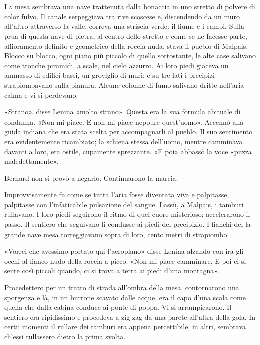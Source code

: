 \documentclass[
a5paper, %
10pt, %
twoside, 
onecolumn, %
openany, %
]{memoir}
\begin{document}
\chapter{\phantom{title}}

\lettrine{L}{a} mesa sembrava una nave trattenuta dalla bonaccia in uno stretto di polvere di color fulvo. Il canale serpeggiava tra rive scoscese e, discendendo da un muro all’altro attraverso la valle, correva una striscia verde: il fiume e i campi. Sulla prua di questa nave di pietra, al centro dello stretto e come se ne facesse parte, affioramento definito e geometrico della roccia nuda, stava il pueblo di Malpais. Blocco su blocco, ogni piano più piccolo di quello sottostante, le alte case salivano come tronche piramidi, a scale, nel cielo azzurro. Ai loro piedi giaceva un ammasso di edifici bassi, un groviglio di muri; e su tre lati i precipizi strapiombavano sulla pianura. Alcune colonne di fumo salivano dritte nell’aria calma e vi si perdevano.

«Strano», disse Lenina «molto strano». Questa era la sua formula abituale di condanna. «Non mi piace. E non mi piace neppure quest’uomo». Accennò alla guida indiana che era stata scelta per accompagnarli al pueblo. Il suo sentimento era evidentemente ricambiato; la schiena stessa dell’uomo, mentre camminava davanti a loro, era ostile, cupamente sprezzante. «E poi» abbassò la voce «puzza maledettamente».

Bernard non si provò a negarlo. Continuarono la marcia.

Improvvisamente fu come se tutta l’aria fosse diventata viva e palpitasse, palpitasse con l’infaticabile pulsazione del sangue. Lassù, a Malpais, i tamburi rullavano. I loro piedi seguirono il ritmo di quel cuore misterioso; accelerarono il passo. Il sentiero che seguivano li condusse ai piedi del precipizio. I fianchi del la grande nave mesa torreggiavano sopra di loro, cento metri di strapiombo.

«Vorrei che avessimo portato qui l’aeroplano» disse Lenina alzando con ira gli occhi al fianco nudo della roccia a picco. «Non mi piace camminare. E poi ci si sente così piccoli quando, ci si trova a terra ai piedi d’una montagna».

Procedettero per un tratto di strada all’ombra della mesa, contornarono una sporgenza e là, in un burrone scavato dalle acque, era il capo d’una scala come quella che dalla cabina conduce ai ponte di poppa. Vi si arrampicarono. Il sentiero era ripidissimo e procedeva a zig zag da una parete all’altra della gola. In certi: momenti il rullare dei tamburi era appena percettibile, in altri, sembrava ch’essi rullassero dietro la prima svolta.
\end{document}
